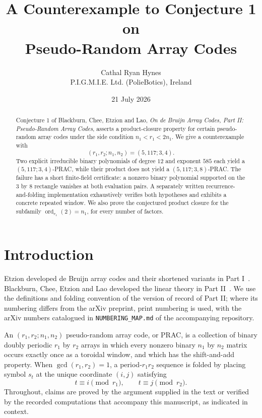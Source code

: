 \documentclass[11pt]{article}
\title{A Counterexample to Conjecture 1 on\\
Pseudo-Random Array Codes}
\author{Cathal Ryan Hynes\\
\small P.I.G.M.I.E. Ltd. (PolieBotics), Ireland}
\date{21 July 2026}
\newcommand{\ord}{\operatorname{ord}}
\begin{document}
\maketitle

\begin{abstract}
\noindent
Conjecture 1 of Blackburn, Chee, Etzion and Lao,
\emph{On de Bruijn Array Codes, Part II: Pseudo-Random Array Codes},
asserts a product-closure property for certain pseudo-random array codes
under the side condition \(n_1<r_1<2n_1\).
We give a counterexample with
\[
 (r_1,r_2;n_1,n_2)=(5,117;3,4).
\]
Two explicit irreducible binary polynomials of degree \(12\) and exponent
\(585\) each yield a \((5,117;3,4)\)-PRAC, while their product does not
yield a \((5,117;3,8)\)-PRAC.
The failure has a short finite-field certificate: a nonzero binary
polynomial supported on the \(3\) by \(8\) rectangle vanishes at both
evaluation pairs.
A separately written recurrence-and-folding implementation exhaustively
verifies both hypotheses and exhibits a concrete repeated window.
We also prove the conjectured product closure for the subfamily
\(\ord_{r_1}(2)=n_1\), for every number of factors.
\end{abstract}

\section{Introduction}

Etzion developed de Bruijn array codes and their shortened variants in
Part I~\cite{etzion-part1}.  Blackburn, Chee, Etzion and Lao developed the
linear theory in Part II~\cite{blackburn-part2}.  We use the definitions and
folding convention of the version of record of Part II; where its
numbering differs from the arXiv preprint, print numbering is used,
with the arXiv numbers catalogued in \nolinkurl{NUMBERING_MAP.md} of
the accompanying repository.

An \((r_1,r_2;n_1,n_2)\) pseudo-random array code, or PRAC, is a collection
of binary doubly periodic \(r_1\) by \(r_2\) arrays in which every nonzero
binary \(n_1\) by \(n_2\) matrix occurs exactly once as a toroidal window,
and which has the shift-and-add property.  When
\(\gcd(r_1,r_2)=1\), a period-\(r_1r_2\) sequence is folded by placing
symbol \(s_t\) at the unique coordinate \((i,j)\) satisfying
\[
 t\equiv i\pmod {r_1},\qquad t\equiv j\pmod {r_2}.
\]
Throughout, claims are proved by the argument supplied in the text or
verified by the recorded computations that accompany this manuscript,
as indicated in context.
\end{document}
